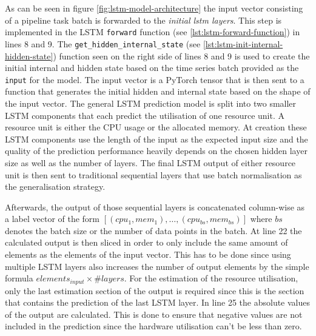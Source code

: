   As can be seen in figure \ref{fig:lstm-model-architecture} the input vector consisting of a pipeline task batch is forwarded to the \emph{initial lstm layers}. This step is implemented in the LSTM \texttt{forward} function (see \ref{lst:lstm-forward-function}) in lines 8 and 9. The \texttt{get\_hidden\_internal\_state} (see \ref{lst:lstm-init-internal-hidden-state}) function seen on the right side of lines 8 and 9 is used to create the initial internal and hidden state based on the time series batch provided as the \texttt{input} for the model. The input vector is a PyTorch tensor that is then sent to a function that generates the initial hidden and internal state based on the shape of the input vector.
  The general LSTM prediction model is split into two smaller LSTM components that each predict the utilisation of one resource unit. A resource unit is either the CPU usage or the allocated memory. At creation these LSTM components use the length of the input as the expected input size and the quality of the prediction performance heavily depends on the chosen hidden layer size as well as the number of  layers.
  The final LSTM output of either resource unit is then sent to traditional sequential layers that use batch normalisation as the generalisation strategy.
  
  Afterwards, the output of those sequential layers is concatenated column-wise as a label vector of the form $\left[(cpu_1, mem_1), \dots, (cpu_{bs}, mem_{bs})\right]$ where $bs$ denotes the batch size or the number of data points in the batch.
  At line 22 the calculated output is then sliced in order to only include the same amount of elements as the elements of the input vector. This has to be done since using multiple LSTM layers also increases the number of output elements by the simple formula $elements_{input} \times \#layers$. For the estimation of the resource utilisation, only the last estimation section of the output is required since this is the section that contains the prediction of the last LSTM layer.
  In line 25 the absolute values of the output are calculated. This is done to ensure that negative values are not included in the prediction since the hardware utilisation can't be less than zero.

  

  


